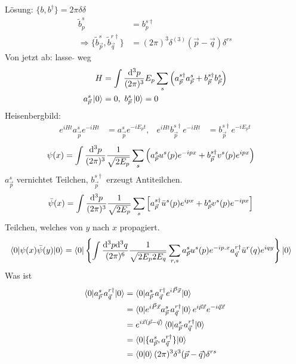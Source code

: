 Lösung: $\{b, b^\dagger\} = 2 \pi \delta \delta$
	\begin{align*}
		\tilde{b}^s_p &= b_p^{s\dagger} \\
		\Rightarrow \{\tilde{b}^s_{\vec{p}}, \tilde{b}^{r\dagger}_{\vec{q}}\} &= 
		(2 \pi)^3 \delta^{(3)} (\vec{p}- \vec{q}) \delta^{rs}
	\end{align*}
Von jetzt ab: lasse $\tilde{}$ weg 
	\begin{align*}
		H &= \int \frac{\mathrm{d}^3 p}{(2\pi)^3} E_p \sum_s 
		\left(
			a_{\vec{p}}^{s\dagger} a_{\vec{p}}^{s}
			+ b_{\vec{p}}^{s\dagger} b_{\vec{p}}^{s}
		\right) \\
		a_{\vec{p}}^{s} \ket{0}&= 0, ~b_{\vec{p}}^{s} \ket{0} = 0
	\end{align*}
Heisenbergbild:
	\begin{align*}
		e^{iHt}a_{\vec{p}}^{s} e^{-iHt} &= a_{\vec{p}}^{s} e^{-iE_p t},&
		e^{iHt}b_{\vec{p}}^{s\dagger} e^{-iHt} &= b_{\vec{p}}^{s\dagger} e^{-iE_p t}
	\end{align*}
	\begin{align*}
		\psi(x) &= \int \frac{\mathrm{d}^3 p}{(2\pi)^3} \frac{1}{\sqrt{2 E_p}} \sum_s
		\left(
			a_{\vec{p}}^{s} u^s(p) e^{-ipx} + b_{\vec{p}}^{s \dagger} v^s(p) e^{ipx}	
		\right)
	\end{align*}
$a_{\vec{p}}^{s}$ vernichtet Teilchen, $b_{\vec{p}}^{s \dagger}$ erzeugt Antiteilchen.
	\begin{align*}
		\bar{\psi} (x) &= 
		\int \frac{\mathrm{d}^3 p}{(2\pi)^3} \frac{1}{\sqrt{2 E_p}} \sum_s
		\left[
			a_{\vec{p}}^{s\dagger} \bar{u}^s(p) e^{ipx} + b_{\vec{p}}^{s} v^s(p) e^{-ipx}
		\right]
	\end{align*}
Teilchen, welches von $y$ nach $x$ propagiert.
	\begin{align*}
		\braket{0 | \psi(x) \bar{\psi}(y) | 0} &=
		\braket{0 | 
			\left\{\int \frac{\mathrm{d}^3 p \mathrm{d}^3 q}{(2\pi)^6} \frac{1}{\sqrt{2 E_p 2 E_q}}\sum_{r,s} a_{\vec{p}}^{s} u^s(p) e^{-ip.x} a_{\vec{q}}^{r\dagger} \bar{u}^r(q) e^{iqy} 
 			\right\}| 0}
	\end{align*}
Was ist 
	\begin{align*}
		\braket{0 | a_{\vec{p}}^{s} \,a_{\vec{q}}^{r \dagger} | 0} &= 
		\braket{0 | a_{\vec{p}}^{s} \, a_{\vec{q}}^{r \dagger}e^{i\vec{P}\vec{x}} | 0} \\
		&= \braket{0 | e^{i\vec{P}\vec{x}} a_{\vec{p}}^{s}\, a_{\vec{q}}^{r \dagger} | 0}
		e^{i\vec{p} \vec{x}} e^{-i\vec{q}\vec{x}} \\
		&= e^{i\vec{x}(\vec{p} - \vec{q})} 
		\braket{0 | a_{\vec{p}}^{s} \,a_{\vec{q}}^{r \dagger} | 0} \\
		&= \braket{0 | \{a_{\vec{p}}^{s} , a_{\vec{q}}^{r \dagger}\} | 0} \\
		&= \braket{0 | 0} (2\pi)^3 \delta^3 (\vec{p}- \vec{q}) \delta^{rs} 
	\end{align*}
